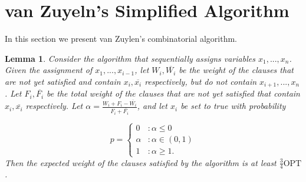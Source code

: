 \documentclass[11pt,letter]{article}
\newtheorem{lemma}{Lemma}
\begin{document}
\section{van Zuyeln's Simplified Algorithm}\label{S:vZ}

In this section we present van Zuylen's combinatorial algorithm.

\begin{lemma}
Consider the algorithm that sequentially assigns variables $x_1,...,x_n$. Given the assignment of $x_1,...,x_{i-1}$,
 let $W_i, \overline{W_i}$ be the weight of the clauses that are not yet satisfied and contain $x_i, \overline{x_i}$ respectively,
 but do not contain $x_{i+1}, ..., x_n$. Let $F_i, \overline{F_i}$ be the total weight of the clauses that are not yet satisfied
 that contain $x_i, \overline{x_i}$ respectively. Let $\alpha = \frac{W_i + F_i - \overline{W_i}}{F_i + \overline{F_i}}$, and let $x_i$ be set to true with probability

\begin{displaymath}
  p = \left\{
     \begin{array}{lr}
       0 & : \alpha \leq 0\\
       \alpha & : \alpha \in (0,1) \\
       1 & : \alpha \geq 1.
     \end{array}
   \right.
\end{displaymath}
Then the expected weight of the clauses satisfied by the algorithm is at least $\frac{3}{4} \text{OPT}$.
\end{lemma}
\end{document}
